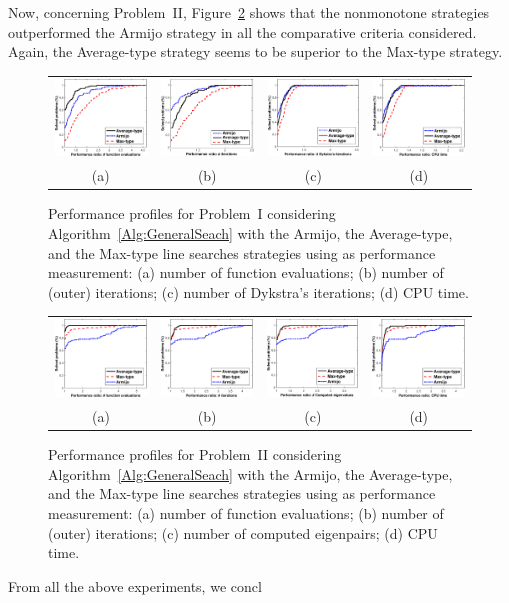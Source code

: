Now, concerning Problem~II, Figure~\ref{ppSpec} shows that the nonmonotone strategies outperformed the Armijo strategy in all the comparative criteria considered.
Again,  the Average-type strategy seems to be superior to the Max-type strategy.

\begin{figure}[H]\centering
	\begin{tabular}{cccc}
		\includegraphics[scale=\myscale]{figures/ppSDDnfev} &\includegraphics[scale=\myscale]{figures/ppSDDit} & \includegraphics[scale=\myscale]{figures/ppSDDnDIT} & \includegraphics[scale=\myscale]{figures/ppSDDtime} \\
		(a) & (b) & (c) & (d)\\ 
	\end{tabular}
	\caption[Performance profiles for Problem~I]{Performance profiles for Problem~I considering  Algorithm~\ref{Alg:GeneralSeach} with the Armijo, the Average-type, and the Max-type line searches strategies using as performance measurement: (a) number of function evaluations; (b) number of (outer) iterations; (c) number of Dykstra’s iterations; (d) CPU time.}
	\label{ppSDD}
\end{figure}

\begin{figure}[H]\centering
	\begin{tabular}{cccc}
		\includegraphics[scale=\myscale]{figures/ppSpecnfev}&\includegraphics[scale=\myscale]{figures/ppSpecit} & \includegraphics[scale=\myscale]{figures/ppSpecnFW} & \includegraphics[scale=\myscale]{figures/ppSpectime} \\
		(a) & (b) & (c) & (d)\\
	\end{tabular}
	\caption[Performance profiles for Problem~II]{Performance profiles for Problem~II considering  Algorithm~\ref{Alg:GeneralSeach} with the Armijo, the Average-type, and the Max-type line searches strategies using as performance measurement: (a) number of function evaluations; (b) number of (outer) iterations; (c) number of computed eigenpairs; (d) CPU time.}
	\label{ppSpec}
\end{figure}

From all the above experiments, we concl